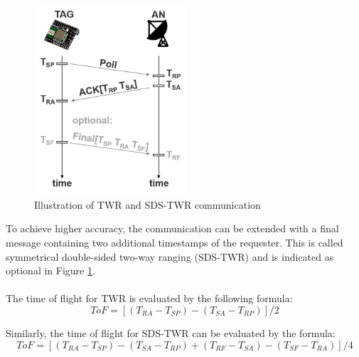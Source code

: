\begin{figure}[th]
\centering
\includegraphics[width=0.5\textwidth]{Figures/two_way_ranging}
\decoRule
\caption[Two Way Ranging]{Illustration of TWR and SDS-TWR communication}
\label{fig:two_way_ranging}
\end{figure}

To achieve higher accuracy, the communication can be extended with a final message containing two additional timestamps of the requester. This is called symmetrical double-sided two-way ranging (SDS-TWR) \cite{Wikipedia} and is indicated as optional in Figure \ref{fig:two_way_ranging}.\\
\\
The time of flight for TWR is evaluated by the following formula:\\
\begin{equation}
 ToF = [(T_{RA}-T_{SP})-(T_{SA}-T_{RP})] / 2
\label{eqn:TWR}
\end{equation}

Similarly, the time of flight for SDS-TWR can be evaluated by the formula:\\
\begin{equation}
ToF = [(T_{RA}-T_{SP})-(T_{SA}-T_{RP}) + (T_{RF}-T_{SA})-(T_{SF}-T_{RA}) ]/ 4
\label{eqn:SDS-TWR}
\end{equation}

